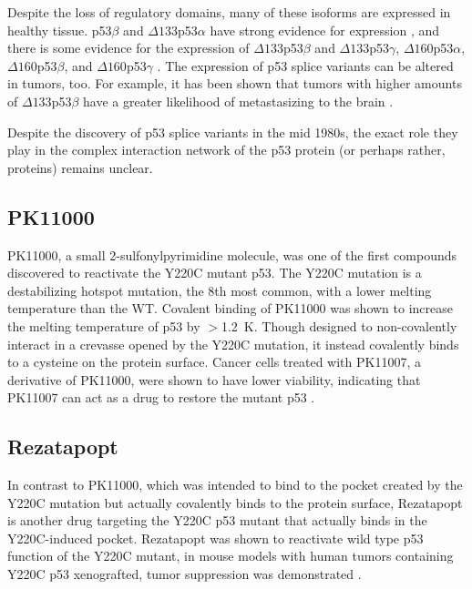 Despite the loss of regulatory domains, many of these isoforms are expressed in healthy tissue. p53\(\beta\) and \(\Delta 133\)p53\(\alpha\) have strong evidence for expression \parencite{mondalD133p53aNaturalP532018, fujitaP53IsoformsD133p532009}, and there is some evidence for the expression of \(\Delta 133\)p53\(\beta\) and \(\Delta 133\)p53\(\gamma\), \(\Delta 160\)p53\(\alpha\), \(\Delta 160\)p53\(\beta\), and \(\Delta 160\)p53\(\gamma\) \parencite{khouryP53Isoforms2011}. The expression of p53 splice variants can be altered in tumors, too. For example, it has been shown that tumors with higher amounts of \(\Delta 133\)p53\(\beta\) have a greater likelihood of metastasizing to the brain \parencite{jesusIncreasedExpressionD133p53v2023}.

Despite the discovery of p53 splice variants in the mid 1980s, the exact role they play in the complex interaction network of the p53 protein (or perhaps rather, proteins) remains unclear.

\subsection{PK11000}

PK11000, a small 2-sulfonylpyrimidine molecule, was one of the first compounds discovered to reactivate the Y220C mutant p53. The Y220C mutation is a destabilizing hotspot mutation, the \num{8}th most common, with a lower melting temperature than the WT. Covalent binding of PK11000 was shown to increase the melting temperature of p53 by \(>\)\qty{1.2}{\kelvin}. Though designed to non-covalently interact in a crevasse opened by the Y220C mutation, it instead covalently binds to a cysteine on the protein surface. Cancer cells treated with PK11007, a derivative of PK11000, were shown to have lower viability, indicating that PK11007 can act as a drug to restore the mutant p53 \parencite{bauer2SulfonylpyrimidinesMildAlkylating2016}.

\subsection{Rezatapopt}

In contrast to PK11000, which was intended to bind to the pocket created by the Y220C mutation but actually covalently binds to the protein surface, Rezatapopt is another drug targeting the Y220C p53 mutant that actually binds in the Y220C-induced pocket. Rezatapopt was shown to reactivate wild type p53 function of the Y220C mutant, in mouse models with human tumors containing Y220C p53 xenografted, tumor suppression was demonstrated \parencite{vuDiscoveryRezatapoptPC145862025}.

